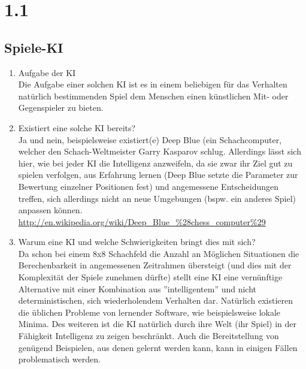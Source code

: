 \documentclass[a4paper,11pt,fleqn]{scrartcl}
\title{\titleinfo}
\author{\authorinfo}
\begin{document}
\maketitle
\section*{1.1}
\subsection*{Spiele-KI}
\begin{enumerate}
	\item Aufgabe der KI \\
	Die Aufgabe einer solchen KI ist es in einem beliebigen für das Verhalten natürlich bestimmenden Spiel dem Menschen einen künstlichen Mit- oder Gegenspieler zu bieten.
	\item Existiert eine solche KI bereits? \\
	Ja und nein, beispielsweise existiert(e) Deep Blue (ein Schachcomputer, welcher den Schach-Weltmeister Garry Kasparov schlug. Allerdings lässt sich hier, wie bei jeder KI die Intelligenz anzweifeln, da sie zwar ihr Ziel gut zu spielen verfolgen, aus Erfahrung lernen (Deep Blue setzte die Parameter zur Bewertung einzelner Positionen fest) und angemessene Entscheidungen treffen, sich allerdings nicht an neue Umgebungen (bspw. ein anderes Spiel) anpassen können.
	\url{http://en.wikipedia.org/wiki/Deep_Blue_%28chess_computer%29}
	\item Warum eine KI und welche Schwierigkeiten bringt dies mit sich? \\
	Da schon bei einem 8x8 Schachfeld die Anzahl an Möglichen Situationen die Berechenbarkeit in angemessenen Zeitrahmen übersteigt (und dies mit der Komplexität der Spiele zunehmen dürfte) stellt eine KI eine vernünftige Alternative mit einer Kombination aus ''intelligentem'' und nicht deterministischen, sich wiederholendem Verhalten dar. Natürlich existieren die üblichen Probleme von lernender Software, wie beispielsweise lokale Minima. Des weiteren ist die KI natürlich durch ihre Welt (ihr Spiel) in der Fähigkeit Intelligenz zu zeigen beschränkt. Auch die Bereitstellung von genügend Beispielen, aus denen gelernt werden kann, kann in einigen Fällen problematisch werden. 
\end{enumerate}
\end{document}
